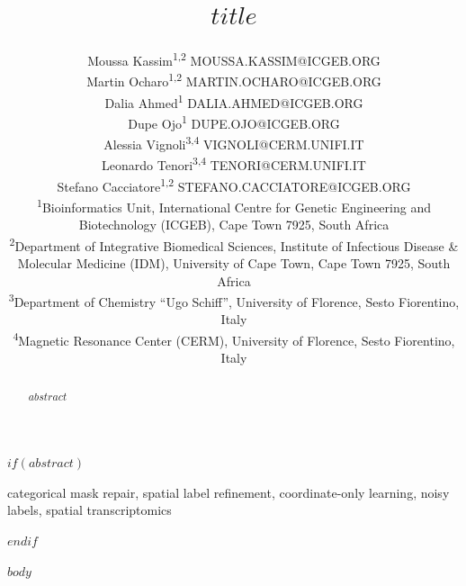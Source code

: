 \documentclass[twoside,11pt]{article}
\begin{document}
\raggedbottom

\title{$title$}

\author{%
\name Moussa Kassim\textsuperscript{1,2} \email MOUSSA.KASSIM@ICGEB.ORG \\
\name Martin Ocharo\textsuperscript{1,2} \email MARTIN.OCHARO@ICGEB.ORG \\
\name Dalia Ahmed\textsuperscript{1} \email DALIA.AHMED@ICGEB.ORG \\
\name Dupe Ojo\textsuperscript{1} \email DUPE.OJO@ICGEB.ORG \\
\name Alessia Vignoli\textsuperscript{3,4} \email VIGNOLI@CERM.UNIFI.IT \\
\name Leonardo Tenori\textsuperscript{3,4} \email TENORI@CERM.UNIFI.IT \\
\name Stefano Cacciatore\textsuperscript{1,2} \email STEFANO.CACCIATORE@ICGEB.ORG \\
\addr \textsuperscript{1}Bioinformatics Unit, International Centre for Genetic
Engineering and Biotechnology (ICGEB), Cape Town 7925, South Africa \\
\addr \textsuperscript{2}Department of Integrative Biomedical Sciences,
Institute of Infectious Disease \& Molecular Medicine (IDM), University of Cape
Town, Cape Town 7925, South Africa \\
\addr \textsuperscript{3}Department of Chemistry ``Ugo Schiff'', University of
Florence, Sesto Fiorentino, Italy \\
\addr \textsuperscript{4}Magnetic Resonance Center (CERM), University of Florence,
Sesto Fiorentino, Italy}

\maketitle

$if(abstract)$
\begin{abstract}
$abstract$
\end{abstract}
\begin{keywords}
categorical mask repair, spatial label refinement, coordinate-only learning,
noisy labels, spatial transcriptomics
\end{keywords}
$endif$

$body$
\end{document}
